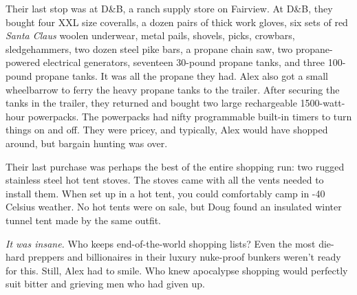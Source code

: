 Their last stop was at D\&B, a ranch supply store on Fairview. At D\&B,
they bought four XXL size coveralls, a dozen pairs of thick work gloves,
six sets of red \emph{Santa Claus} woolen underwear, metal pails,
shovels, picks, crowbars, sledgehammers, two dozen steel pike bars, a
propane chain saw, two propane-powered electrical generators, seventeen
30-pound propane tanks, and three 100-pound propane tanks. It was all
the propane they had. Alex also got a small wheelbarrow to ferry the
heavy propane tanks to the trailer. After securing the tanks in the
trailer, they returned and bought two large rechargeable 1500-watt-hour
powerpacks. The powerpacks had nifty programmable built-in timers to
turn things on and off. They were pricey, and typically, Alex would have
shopped around, but bargain hunting was over.

Their last purchase was perhaps the best of the entire shopping run: two
rugged stainless steel hot tent stoves. The stoves came with all the
vents needed to install them. When set up in a hot tent, you could
comfortably camp in -40 Celsius weather. No hot tents were on sale, but
Doug found an insulated winter tunnel tent made by the same outfit.

\emph{It was insane.} Who keeps end-of-the-world shopping lists? Even
the most die-hard preppers and billionaires in their luxury nuke-proof
bunkers weren't ready for this. Still, Alex had to smile. Who knew
apocalypse shopping would perfectly suit bitter and grieving men who had
given up.


%

